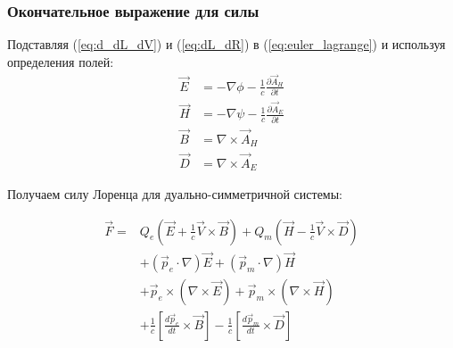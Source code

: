 \documentclass[a4paper,10pt]{article}
\newcommand{\modblock}[1]{\colorbox{modcolor!10}{\parbox{\dimexpr\linewidth-2\fboxsep}{#1}}}
\begin{document}
\modblock{

\subsubsection{Окончательное выражение для силы}

Подставляя (\ref{eq:d_dL_dV}) и (\ref{eq:dL_dR}) в (\ref{eq:euler_lagrange}) и используя определения полей:
\begin{align}
\vec{E} &= -\nabla\phi - \frac{1}{c}\frac{\partial\vec{A}_H}{\partial t} \\
\vec{H} &= -\nabla\psi - \frac{1}{c}\frac{\partial\vec{A}_E}{\partial t} \\
\vec{B} &= \nabla\times\vec{A}_H \\
\vec{D} &= \nabla\times\vec{A}_E
\end{align}

Получаем силу Лоренца для дуально-симметричной системы:

\begin{equation}
\boxed{
\begin{aligned}
\vec{F} = & Q_e\left(\vec{E} + \frac{1}{c}\vec{V}\times\vec{B}\right) + Q_m\left(\vec{H} - \frac{1}{c}\vec{V}\times\vec{D}\right) \\
& + (\vec{p}_e\cdot\nabla)\vec{E} + (\vec{p}_m\cdot\nabla)\vec{H} \\
& + \vec{p}_e\times(\nabla\times\vec{E}) + \vec{p}_m\times(\nabla\times\vec{H}) \\
& + \frac{1}{c}\left[\frac{d\vec{p}_e}{dt}\times\vec{B}\right] - \frac{1}{c}\left[\frac{d\vec{p}_m}{dt}\times\vec{D}\right]
\end{aligned}
}
\label{eq:final_force}
\end{equation}

} %
\end{document}
